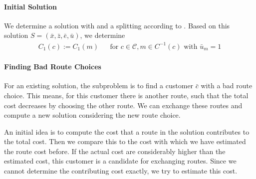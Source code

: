 \paragraph{Initial Solution} \parfill

We determine a solution with  and a splitting according to . Based on this solution $S=\left(\bar{x},\bar{z},\bar{e},\bar{u}\right)$, we determine 
\begin{align*}
	C_1(c) := C_1(m) && \text{for } c\in\mathcal{C}, m\in C^{-1}(c) \text{ with } \bar{u}_m = 1
\end{align*}

\paragraph{Finding Bad Route Choices} \parfill

For an existing solution, the subproblem is to find a customer $\bar{c}$ with a bad route choice. This means, for this customer there is another route, such that the total cost decreases by choosing the other route. We can exchange these routes and compute a new solution considering the new route choice. 

An initial idea is to compute the cost that a route in the solution contributes to the total cost. Then we compare this to the cost with which we have estimated the route cost before. If the actual cost are considerably higher than the estimated cost, this customer is a candidate for exchanging routes. Since we cannot determine the contributing cost exactly, we try to estimate this cost.

